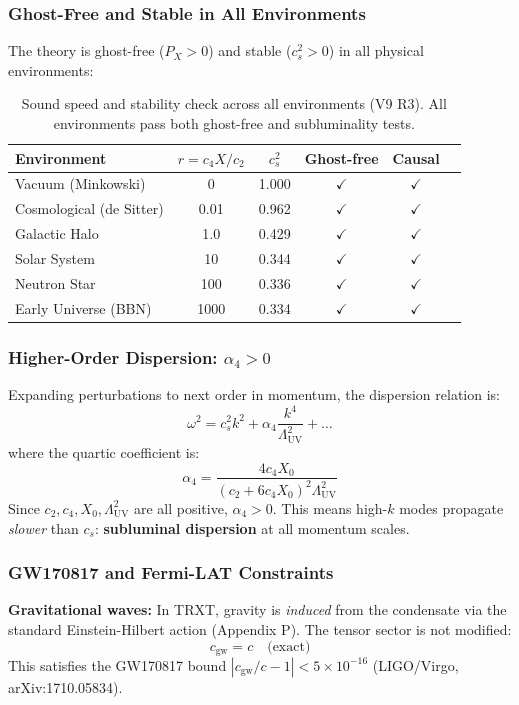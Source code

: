 \documentclass[a4paper,12pt]{article}
\begin{document}
\subsubsection{Ghost-Free and Stable in All Environments}
The theory is ghost-free ($P_X > 0$) and stable ($c_s^2 > 0$) in all physical environments:

\begin{table}[H]
\centering
\caption{Sound speed and stability check across all environments (V9 R3). All environments pass both ghost-free and subluminality tests.}
\label{tab:lorentz_v9}
\begin{tabular}{@{}lccccc@{}}
\toprule
\textbf{Environment} & $r = c_4 X/c_2$ & $c_s^2$ & \textbf{Ghost-free} & \textbf{Causal} \\
\midrule
Vacuum (Minkowski) & 0 & 1.000 & $\checkmark$ & $\checkmark$ \\
Cosmological (de Sitter) & 0.01 & 0.962 & $\checkmark$ & $\checkmark$ \\
Galactic Halo & 1.0 & 0.429 & $\checkmark$ & $\checkmark$ \\
Solar System & 10 & 0.344 & $\checkmark$ & $\checkmark$ \\
Neutron Star & 100 & 0.336 & $\checkmark$ & $\checkmark$ \\
Early Universe (BBN) & 1000 & 0.334 & $\checkmark$ & $\checkmark$ \\
\bottomrule
\end{tabular}
\end{table}

\subsubsection{Higher-Order Dispersion: $\alpha_4 > 0$}
Expanding perturbations to next order in momentum, the dispersion relation is:
\begin{equation}
    \omega^2 = c_s^2 k^2 + \alpha_4 \frac{k^4}{\Lambda_{\mathrm{UV}}^2} + \ldots
\end{equation}
where the quartic coefficient is:
\begin{equation}
    \alpha_4 = \frac{4c_4 X_0}{(c_2 + 6c_4 X_0)^2 \Lambda_{\mathrm{UV}}^2}
\end{equation}
Since $c_2, c_4, X_0, \Lambda_{\mathrm{UV}}^2$ are all positive, $\alpha_4 > 0$. This means high-$k$ modes propagate \emph{slower} than $c_s$: \textbf{subluminal dispersion} at all momentum scales.

\subsubsection{GW170817 and Fermi-LAT Constraints}
\textbf{Gravitational waves:} In TRXT, gravity is \emph{induced} from the condensate via the standard Einstein-Hilbert action (Appendix P). The tensor sector is not modified:
\begin{equation}
    c_{\mathrm{gw}} = c \quad \text{(exact)}
\end{equation}
This satisfies the GW170817 bound $|c_{\mathrm{gw}}/c - 1| < 5 \times 10^{-16}$ (LIGO/Virgo, arXiv:1710.05834).
\end{document}
